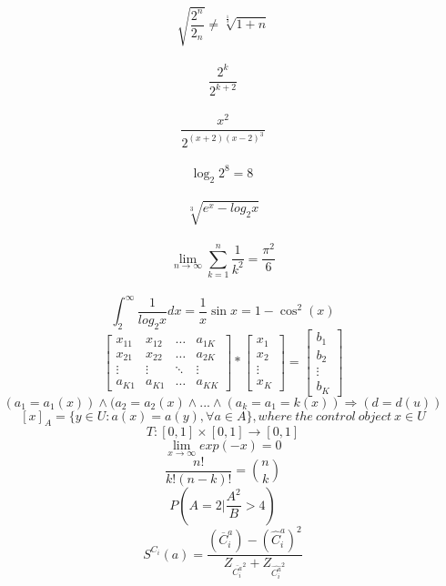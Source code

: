 \documentclass[12pt, letterpaper, titlepage]{article}
\begin{document}
$$ \sqrt{ \frac{2^{n}}{2_n}} \neq \sqrt[\frac{1}{3}]{1+n} $$\\
$$ \frac{2^{k}}{2^{k+2}} $$\\
$$ \frac{x^{2}}{2^{(x+2)(x-2)^3}} $$\\
$$ \log_{2}2^{8}=8 \ $$\\ 
$$ \sqrt[3]{e^{x}-log_{2}x} $$\\
$$ \lim_{n\rightarrow\infty}\sum_{k=1}^{n} \frac{1}{k^2}= \frac{\pi^{2}}{6}$$\\
$$ \int_{2}^{\infty}\frac{1}{log_{2}x}dx=\frac{1}{x}\sin{x}=1-\cos^{2}(x)$$
$$\mathbf{}
\left[ \begin{array}{cccc}
x_{11} & x_{12} & \ldots & a_{1K} \\ 
x_{21} & x_{22} & \ldots & a_{2K} \\
\vdots & \vdots & \ddots & \vdots \\
a_{K1} & a_{K1} & \ldots & a_{KK}
\end{array} \right]
*
\mathbf{}
\left[ \begin{array}{c}
x_{1} \\ 
x_{2} \\
\vdots\\
x_{K} 
\end{array} \right]
=
\mathbf{}
\left[ \begin{array}{c}
b_{1} \\ 
b_{2} \\
\vdots\\
b_{K} 
\end{array} \right]$$
$$(a_1=a_1(x)) \wedge (a_2=a_2(x) \wedge ... \wedge (a_k=a_1=k(x))\Rightarrow (d=d(u))$$
$$[x]_A=\{y\in U:a(x)=a(y),\forall a \in A\}, where \ the \ control \ object \ x \in U$$
$$T:[0,1]\times[0,1]\rightarrow[0,1]$$
$$\lim_{x\rightarrow\infty} exp(-x)=0 $$
$$\frac{n!}{k!(n-k)!} =  {n \choose k} $$
$$P\left(A=2\bigg|\frac{A^2}{B}>4\right)$$
$$S^{C_i}(a)=\frac{(\overline{C}^{a}_i)-(\hat{C}^a_i)^2}{Z_{\bar{C^a_i}^2}+Z_{\hat{C^a_i}^2}}$$
\end{document}
